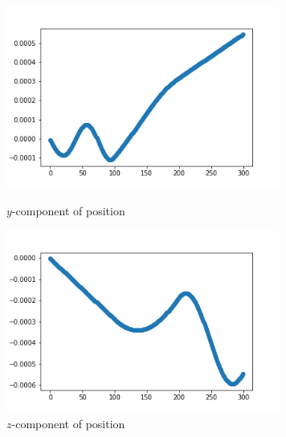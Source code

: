 \documentclass[12pt]{article}
\begin{document}
	\begin{figure}[H]
		\begin{multicols}{2}
			\includegraphics[width=\linewidth, height=6cm]{psy2.png} \caption{$y$-component of position} \label{psy2} \par
			\includegraphics[width=\linewidth, height=6cm]{psz2.png} \caption{$z$-component of position} \label{psz2} \par
		\end{multicols}
	\end{figure}
	
\end{document}
